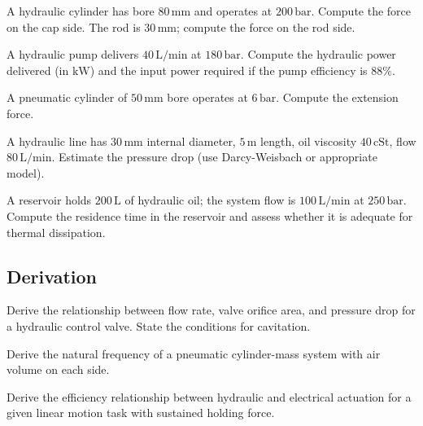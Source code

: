 \begin{exercise}
A hydraulic cylinder has bore $80\,\text{mm}$ and operates at $200\,\text{bar}$. Compute the force on the cap side. The rod is $30\,\text{mm}$; compute the force on the rod side.
\end{exercise}

\begin{exercise}
A hydraulic pump delivers $40\,\text{L/min}$ at $180\,\text{bar}$. Compute the hydraulic power delivered (in $\text{kW}$) and the input power required if the pump efficiency is $88\%$.
\end{exercise}

\begin{exercise}
A pneumatic cylinder of $50\,\text{mm}$ bore operates at $6\,\text{bar}$. Compute the extension force.
\end{exercise}

\begin{exercise}
A hydraulic line has $30\,\text{mm}$ internal diameter, $5\,\text{m}$ length, oil viscosity $40\,\text{cSt}$, flow $80\,\text{L/min}$. Estimate the pressure drop (use Darcy-Weisbach or appropriate model).
\end{exercise}

\begin{exercise}
A reservoir holds $200\,\text{L}$ of hydraulic oil; the system flow is $100\,\text{L/min}$ at $250\,\text{bar}$. Compute the residence time in the reservoir and assess whether it is adequate for thermal dissipation.
\end{exercise}

\subsection*{Derivation}

\begin{exercise}
Derive the relationship between flow rate, valve orifice area, and pressure drop for a hydraulic control valve. State the conditions for cavitation.
\end{exercise}

\begin{exercise}
Derive the natural frequency of a pneumatic cylinder-mass system with air volume on each side.
\end{exercise}

\begin{exercise}
Derive the efficiency relationship between hydraulic and electrical actuation for a given linear motion task with sustained holding force.
\end{exercise}

